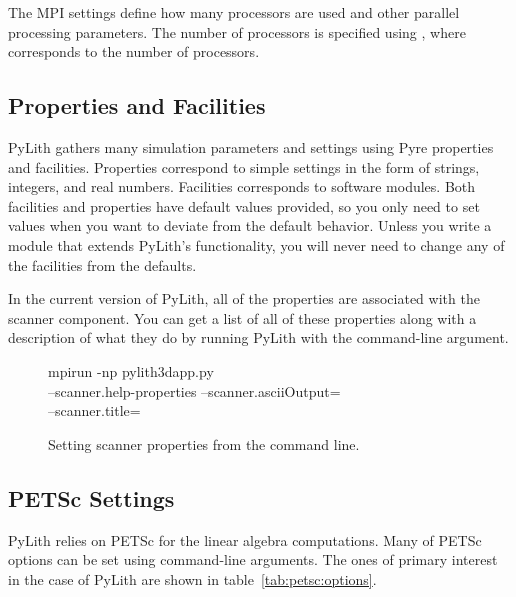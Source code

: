 The MPI settings define how many processors are used and other
parallel processing parameters. The number of processors is specified
using , where  corresponds to
the number of processors.

\subsection{Properties and Facilities}

PyLith gathers many simulation parameters and settings using Pyre
properties and facilities. Properties correspond to simple settings in
the form of strings, integers, and real numbers. Facilities
corresponds to software modules. Both facilities and properties have
default values provided, so you only need to set values when you want
to deviate from the default behavior. Unless you write a module that
extends PyLith's functionality, you will never need to change any of
the facilities from the defaults.

In the current version of PyLith, all of the properties are associated
with the scanner component. You can get a list of all of these
properties along with a description of what they do by running PyLith
with the  command-line argument.

\begin{figure}
  \begin{center}
    \begin{screen}
      mpirun -np  pylith3dapp.py\\
      --scanner.help-properties --scanner.asciiOutput=\\
      --scanner.title=
    \end{screen}
    \caption{Setting scanner properties from the command line.}
  \end{center}
\end{figure}

\subsection{PETSc Settings}

PyLith relies on PETSc for the linear algebra computations. Many of
PETSc options can be set using command-line arguments. The ones of
primary interest in the case of PyLith are shown in
table~\ref{tab:petsc:options}.

